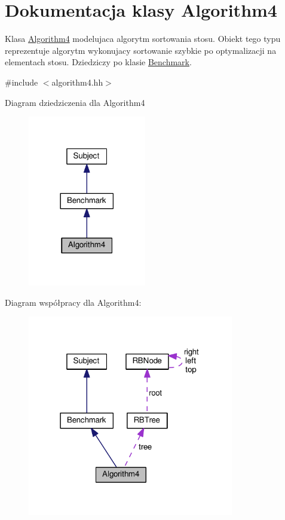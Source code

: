 \hypertarget{class_algorithm4}{\section{Dokumentacja klasy Algorithm4}
\label{class_algorithm4}
}


Klasa \hyperlink{class_algorithm4}{Algorithm4} modelujaca algorytm sortowania stosu. Obiekt tego typu reprezentuje algorytm wykonujacy sortowanie szybkie po optymalizacji na elementach stosu. Dziedziczy po klasie \hyperlink{class_benchmark}{Benchmark}.  




{\ttfamily \#include $<$algorithm4.\-hh$>$}



Diagram dziedziczenia dla Algorithm4
\nopagebreak
\begin{figure}[H]
\begin{center}
\leavevmode
\includegraphics[width=146pt]{class_algorithm4__inherit__graph}
\end{center}
\end{figure}


Diagram współpracy dla Algorithm4\-:
\nopagebreak
\begin{figure}[H]
\begin{center}
\leavevmode
\includegraphics[width=255pt]{class_algorithm4__coll__graph}
\end{center}
\end{figure}
